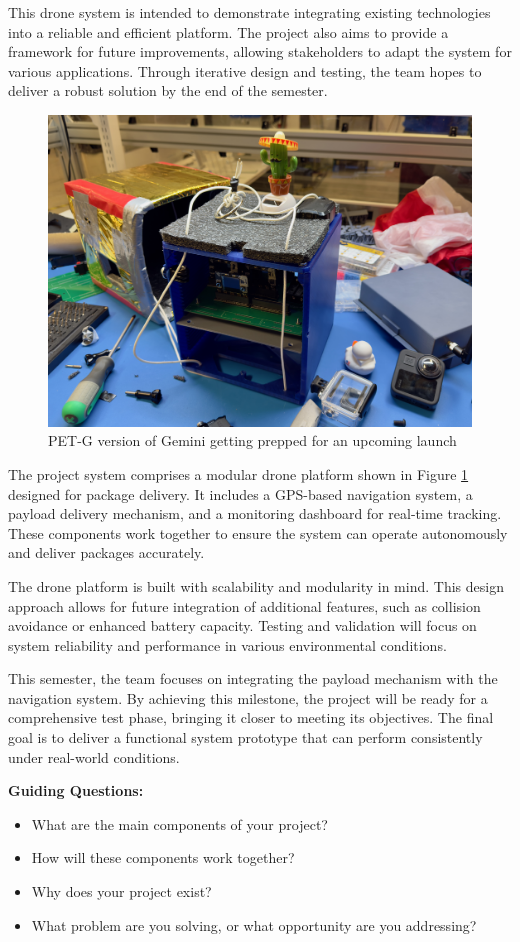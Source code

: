 This drone system is intended to demonstrate integrating existing technologies into a reliable and efficient platform. The project also aims to provide a framework for future improvements, allowing stakeholders to adapt the system for various applications. Through iterative design and testing, the team hopes to deliver a robust solution by the end of the semester.


\begin{figure}[ht]
    \centering
    \includegraphics[width=.4\textwidth]{figures/IMG_5594.jpeg}
    \captionsetup{justification=centering}
    \caption{PET-G version of Gemini getting prepped for an upcoming launch}
    \label{fig:gemini}
\end{figure}

The project system comprises a modular drone platform shown in Figure \ref{fig:gemini} designed for package delivery. It includes a GPS-based navigation system, a payload delivery mechanism, and a monitoring dashboard for real-time tracking. These components work together to ensure the system can operate autonomously and deliver packages accurately.

The drone platform is built with scalability and modularity in mind. This design approach allows for future integration of additional features, such as collision avoidance or enhanced battery capacity. Testing and validation will focus on system reliability and performance in various environmental conditions.

This semester, the team focuses on integrating the payload mechanism with the navigation system. By achieving this milestone, the project will be ready for a comprehensive test phase, bringing it closer to meeting its objectives. The final goal is to deliver a functional system prototype that can perform consistently under real-world conditions. 

\textbf{Guiding Questions:}
\begin{itemize}
    \item What are the main components of your project?
    \item How will these components work together?
    \item Why does your project exist?
    \item What problem are you solving, or what opportunity are you addressing?
\end{itemize}

